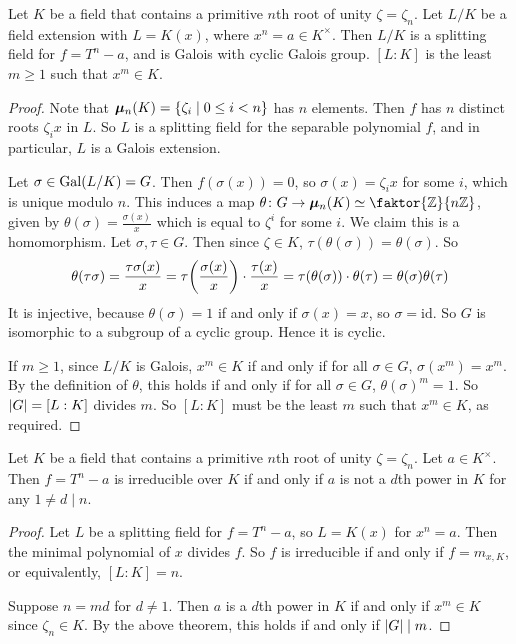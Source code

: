 \begin{theorem}
	Let \( K \) be a field that contains a primitive \( n \)th root of unity \( \zeta = \zeta_n \).
	Let \( L / K \) be a field extension with \( L = K(x) \), where \( x^n = a \in K^\times \).
	Then \( L / K \) is a splitting field for \( f = T^n - a \), and is Galois with cyclic Galois group.
	\( [L : K] \) is the least \( m \geq 1 \) such that \( x^m \in K \).
\end{theorem}
\begin{proof}
	Note that \( \bm \mu_n(K) = \qty{\zeta_i \mid 0 \leq i < n} \) has \( n \) elements.
	Then \( f \) has \( n \) distinct roots \( \zeta_i x \) in \( L \).
	So \( L \) is a splitting field for the separable polynomial \( f \), and in particular, \( L \) is a Galois extension.

	Let \( \sigma \in \operatorname{Gal}(L/K) = G \).
	Then \( f(\sigma(x)) = 0 \), so \( \sigma(x) = \zeta_i x \) for some \( i \), which is unique modulo \( n \).
	This induces a map \( \theta \colon G \to \bm \mu_n(K) \simeq \faktor{\mathbb Z}{n\mathbb Z} \), given by \( \theta(\sigma) = \frac{\sigma(x)}{x} \) which is equal to \( \zeta^i \) for some \( i \).
	We claim this is a homomorphism.
	Let \( \sigma, \tau \in G \).
	Then since \( \zeta \in K \), \( \tau(\theta(\sigma)) = \theta(\sigma) \).
	So
	\[ \theta(\tau\sigma) = \frac{\tau\sigma(x)}{x} = \tau\qty(\frac{\sigma(x)}{x}) \cdot \frac{\tau(x)}{x} = \tau(\theta(\sigma)) \cdot \theta(\tau) = \theta(\sigma) \theta(\tau) \]
	It is injective, because \( \theta(\sigma) = 1 \) if and only if \( \sigma(x) = x \), so \( \sigma = \mathrm{id} \).
	So \( G \) is isomorphic to a subgroup of a cyclic group.
	Hence it is cyclic.

	If \( m \geq 1 \), since \( L / K \) is Galois, \( x^m \in K \) if and only if for all \( \sigma \in G \), \( \sigma(x^m) = x^m \).
	By the definition of \( \theta \), this holds if and only if for all \( \sigma \in G \), \( \theta(\sigma)^m = 1 \).
	So \( \abs{G} = [L:K] \) divides \( m \).
	So \( [L:K] \) must be the least \( m \) such that \( x^m \in K \), as required.
\end{proof}
\begin{corollary}
	Let \( K \) be a field that contains a primitive \( n \)th root of unity \( \zeta = \zeta_n \).
	Let \( a \in K^\times \).
	Then \( f = T^n - a \) is irreducible over \( K \) if and only if \( a \) is not a \( d \)th power in \( K \) for any \( 1 \neq d \mid n \).
\end{corollary}
\begin{proof}
	Let \( L \) be a splitting field for \( f = T^n - a \), so \( L = K(x) \) for \( x^n = a \).
	Then the minimal polynomial of \( x \) divides \( f \).
	So \( f \) is irreducible if and only if \( f = m_{x,K} \), or equivalently, \( [L : K] = n \).

	Suppose \( n = md \) for \( d \neq 1 \).
	Then \( a \) is a \( d \)th power in \( K \) if and only if \( x^m \in K \) since \( \zeta_n \in K \).
	By the above theorem, this holds if and only if \( \abs{G} \mid m \).
\end{proof}
